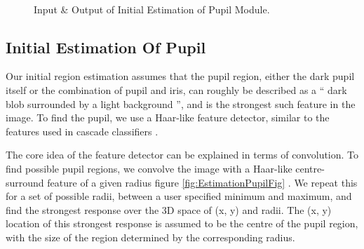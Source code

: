 \begin{figure}[]
\begin{dBox}
\centering
  \mbox{
   }
   
   \caption{Input \& Output of Initial Estimation of Pupil Module. \label{fig:Initial_Estimation_Of_Pupil} }   
\end{dBox}   
\end{figure}

\subsection{Initial Estimation Of Pupil} 
Our initial region estimation assumes that the pupil region, either the dark pupil itself or the combination of pupil and iris, can roughly be described as a “ dark blob surrounded by a light background ”, and is the strongest such feature in the image. To find the pupil, we use a Haar-like feature detector, similar to the features used in cascade classifiers \cite{ViolaAndJones2001}. \bigskip

The core idea of the feature detector can be explained in terms of convolution. To find possible pupil regions, we convolve the image with a Haar-like centre-surround feature of a given radius figure \ref{fig:EstimationPupilFig} . We repeat this for a set of possible radii, between a user specified minimum and maximum, and find the strongest response over the 3D space of (x, y) and radii. The (x, y) location of this strongest response is assumed to be the centre of the pupil region, with the size of the region determined by the corresponding radius. \bigskip

